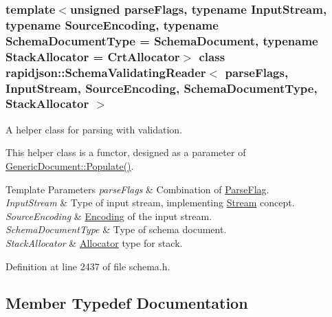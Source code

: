 \subsubsection*{template$<$unsigned parse\+Flags, typename Input\+Stream, typename Source\+Encoding, typename Schema\+Document\+Type = Schema\+Document, typename Stack\+Allocator = Crt\+Allocator$>$\newline
class rapidjson\+::\+Schema\+Validating\+Reader$<$ parse\+Flags, Input\+Stream, Source\+Encoding, Schema\+Document\+Type, Stack\+Allocator $>$}

A helper class for parsing with validation. 

This helper class is a functor, designed as a parameter of \mbox{\hyperlink{classrapidjson_1_1_generic_document_a63e18887979da500ece6f0bd10d29b64}{Generic\+Document\+::\+Populate()}}.


\begin{DoxyTemplParams}{Template Parameters}
{\em parse\+Flags} & Combination of \mbox{\hyperlink{namespacerapidjson_a81379eb4e94a0386d71d15fda882ebc9}{Parse\+Flag}}. \\
\hline
{\em Input\+Stream} & Type of input stream, implementing \mbox{\hyperlink{classrapidjson_1_1_stream}{Stream}} concept. \\
\hline
{\em Source\+Encoding} & \mbox{\hyperlink{classrapidjson_1_1_encoding}{Encoding}} of the input stream. \\
\hline
{\em Schema\+Document\+Type} & Type of schema document. \\
\hline
{\em Stack\+Allocator} & \mbox{\hyperlink{classrapidjson_1_1_allocator}{Allocator}} type for stack. \\
\hline
\end{DoxyTemplParams}


Definition at line 2437 of file schema.\+h.



\subsection{Member Typedef Documentation}
\mbox{\label{classrapidjson_1_1_schema_validating_reader_a3507a4886ce6778fe1cae39ed5f0baaf}} 
